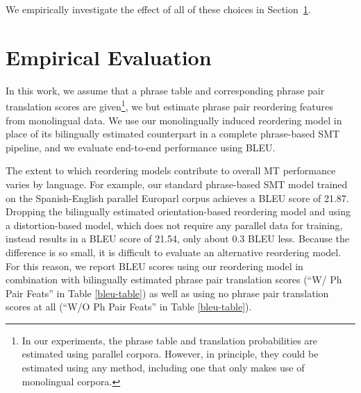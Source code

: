 \documentclass[11pt,letterpaper]{article}
\newcommand{\todo}[1]{\textcolor{red}{TODO: #1}}
\newcommand{\secref}[1]{Section~\ref{#1}}
\begin{document}
We empirically investigate the effect of all of these choices in \secref{sect:eval}.

\section{Empirical Evaluation} \label{sect:eval}

In this work, we assume that a phrase table and corresponding phrase pair translation scores are given\footnote{In our experiments, the phrase table and translation probabilities are estimated using parallel corpora. However, in principle, they could be estimated using any method, including one that only makes use of monolingual corpora.}, we but estimate phrase pair reordering features from monolingual data.  We use our monolingually induced reordering model in place of its bilingually estimated counterpart in a complete phrase-based SMT pipeline, and we evaluate end-to-end performance using BLEU. 

The extent to which reordering models contribute to overall MT performance varies by language. For example, our standard phrase-based SMT model trained on the Spanish-English parallel Europarl corpus achieves a BLEU score of 21.87. Dropping the bilingually estimated orientation-based reordering model and using a distortion-based model, which does not require any parallel data for training, instead results in a BLEU score of 21.54, only about 0.3 BLEU less. Because the difference is so small, it is difficult to evaluate an alternative reordering model. For this reason, we report BLEU scores using our reordering model in combination with bilingually estimated phrase pair translation scores (``W/ Ph Pair Feats'' in Table \ref{bleu-table}) as well as using no phrase pair translation scores at all (``W/O Ph Pair Feats'' in Table \ref{bleu-table}). 

\end{document}
